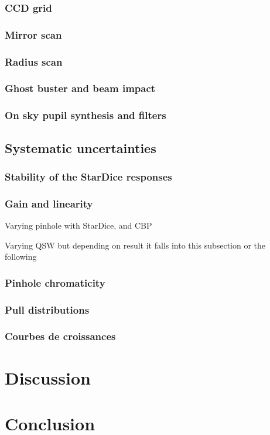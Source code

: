 \documentclass[onecolumn]{aa}
\begin{document}
\subsubsection{CCD grid}

\subsubsection{Mirror scan}

\subsubsection{Radius scan}

\subsubsection{Ghost buster and beam impact}

\subsubsection{On sky pupil synthesis and filters}



\subsection{Systematic uncertainties}
\label{sec:systematics}

\subsubsection{Stability of the StarDice responses}

\subsubsection{Gain and linearity}
\label{sec:gain}

Varying pinhole with StarDice, and CBP

Varying QSW but depending on result it falls into this subsection or the following

\subsubsection{Pinhole chromaticity}

\subsubsection{Pull distributions}

\subsubsection{Courbes de croissances}


\section{Discussion}

\section{Conclusion}
\label{sec:conclusion}
\end{document}
